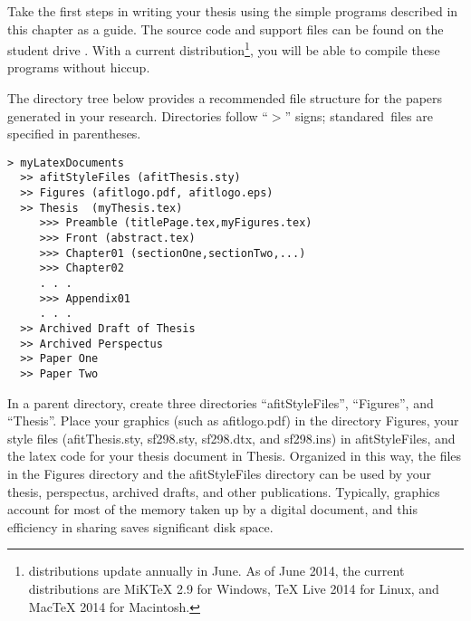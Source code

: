 Take the first steps in writing your thesis using the simple programs
described in this chapter as a guide.  The source code and support files can be
found on the student drive \primerAddress.  With a
current \Latex distribution\footnote{\Latex distributions update
annually in June.  As of June 2014, the current \Latex
distributions are MiKTeX 2.9 for Windows, TeX Live 2014 for Linux, and
MacTeX 2014 for Macintosh.}, you will be able to compile these programs
without hiccup.

The directory tree below provides a recommended file structure
for the papers generated in your research.  Directories follow ``$>$'' signs; 
standared\ files are
specified in parentheses. 
{\singlespace
\begin{lstlisting}
> myLatexDocuments
  >> afitStyleFiles (afitThesis.sty)
  >> Figures (afitlogo.pdf, afitlogo.eps)
  >> Thesis  (myThesis.tex)
     >>> Preamble (titlePage.tex,myFigures.tex)
     >>> Front (abstract.tex)
     >>> Chapter01 (sectionOne,sectionTwo,...)
     >>> Chapter02 
     . . .
     >>> Appendix01
     . . .
  >> Archived Draft of Thesis 
  >> Archived Perspectus 
  >> Paper One
  >> Paper Two
\end{lstlisting}
} \noindent In a parent directory, create three directories
``afitStyleFiles'', ``Figures'', and ``Thesis''.  Place your graphics
(such as afitlogo.pdf) in the directory Figures, your \Latex style
files (afitThesis.sty, sf298.sty, sf298.dtx, and sf298.ins) in
afitStyleFiles, and the latex code for your thesis document in Thesis.
Organized in this way, the files in the Figures directory and the
afitStyleFiles directory can be used by your thesis, perspectus, archived drafts,
and other publications.  Typically, graphics account for most of the
memory taken up by a digital document, and this efficiency in
sharing saves significant disk space.



